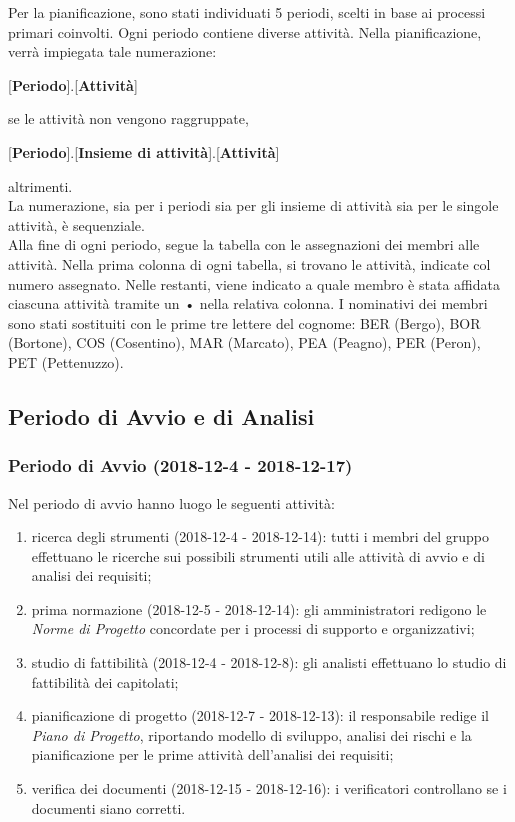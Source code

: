 Per la pianificazione, sono stati individuati 5 periodi, scelti in base ai processi primari coinvolti. Ogni periodo contiene diverse attività. Nella pianificazione, verrà impiegata tale numerazione:
\begin{center}
	[\textbf{Periodo}].[\textbf{Attività}]
\end{center}
se le attività non vengono raggruppate,
\begin{center}
	[\textbf{Periodo}].[\textbf{Insieme di attività}].[\textbf{Attività}]
\end{center}
altrimenti.\\
La numerazione, sia per i periodi sia per gli insieme di attività sia per le singole attività, è sequenziale.\\
Alla fine di ogni periodo, segue la tabella con le assegnazioni dei membri alle attività. Nella prima colonna di ogni tabella, si trovano le attività, indicate col numero assegnato. Nelle restanti, viene indicato a quale membro è stata affidata ciascuna attività tramite un • nella relativa colonna. I nominativi dei membri sono stati sostituiti con le prime tre lettere del cognome: BER (Bergo), BOR (Bortone), COS (Cosentino), MAR (Marcato), PEA (Peagno), PER (Peron), PET (Pettenuzzo).

\subsection{Periodo di Avvio e di Analisi}
	\subsubsection{Periodo di Avvio (2018-12-4 - 2018-12-17)}
		Nel periodo di avvio hanno luogo le seguenti attività:
		\begin{enumerate}[label = 1.\arabic*)]
			\item ricerca degli strumenti (2018-12-4 - 2018-12-14): tutti i membri del gruppo effettuano le ricerche sui possibili strumenti utili alle attività di avvio e di analisi dei requisiti;
			\item prima normazione (2018-12-5 - 2018-12-14): gli amministratori redigono le \textit{Norme di Progetto} concordate per i processi di supporto e organizzativi;
			\item studio di fattibilità (2018-12-4 - 2018-12-8): gli analisti effettuano lo studio di fattibilità dei capitolati;
			\item pianificazione di progetto (2018-12-7 - 2018-12-13): il responsabile redige il \textit{Piano di Progetto}, riportando modello di sviluppo, analisi dei rischi e la pianificazione per le prime attività dell'analisi dei requisiti;
			\item verifica dei documenti (2018-12-15 - 2018-12-16): i verificatori controllano se i documenti siano corretti.
		\end{enumerate}
		
